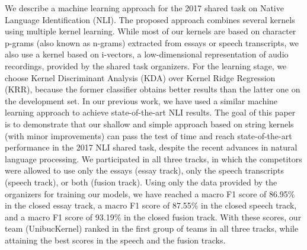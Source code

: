 We describe a machine learning approach for the 2017 shared task on Native Language Identification (NLI). The proposed approach combines several kernels using multiple kernel learning. While most of our kernels are based on character p-grams (also known as n-grams) extracted from essays or speech transcripts, we also use a kernel based on i-vectors, a low-dimensional representation of audio recordings, provided by the shared task organizers. For the learning stage, we choose Kernel Discriminant Analysis (KDA) over Kernel Ridge Regression (KRR), because the former classifier obtains better results than the latter one on the development set. In our previous work, we have used a similar machine learning approach to achieve state-of-the-art NLI results. The goal of this paper is to demonstrate that our shallow and simple approach based on string kernels (with minor improvements) can pass the test of time and reach state-of-the-art performance in the 2017 NLI shared task, despite the recent advances in natural language processing. We participated in all three tracks, in which the competitors were allowed to use only the essays (essay track), only the speech transcripts (speech track), or both (fusion track). Using only the data provided by the organizers for training our models, we have reached a macro F1 score of 86.95\% in the closed essay track, a macro F1 score of 87.55\% in the closed speech track, and a macro F1 score of 93.19\% in the closed fusion track. With these scores, our team (UnibucKernel) ranked in the first group of teams in all three tracks, while attaining the best scores in the speech and the fusion tracks.
